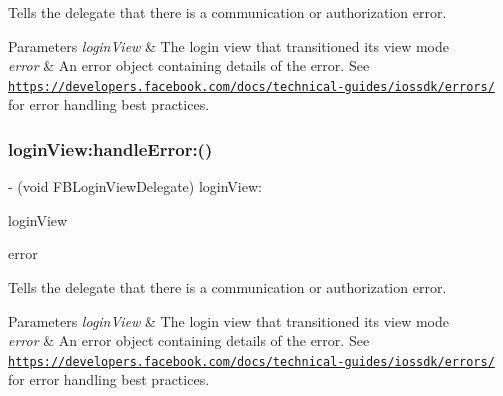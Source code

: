Tells the delegate that there is a communication or authorization error.


\begin{DoxyParams}{Parameters}
{\em login\+View} & The login view that transitioned its view mode \\
\hline
{\em error} & An error object containing details of the error.  See \href{https://developers.facebook.com/docs/technical-guides/iossdk/errors/}{\tt https\+://developers.\+facebook.\+com/docs/technical-\/guides/iossdk/errors/} for error handling best practices. \\
\hline
\end{DoxyParams}
\mbox{\label{protocolFBLoginViewDelegate_01-p_a4cc27024e9c1fac02fbc65fd6bfba993}} 
\subsubsection{\texorpdfstring{login\+View\+:handle\+Error\+:()}{loginView:handleError:()}\hspace{0.1cm}{\footnotesize\ttfamily [2/5]}}
{\footnotesize\ttfamily -\/ (void F\+B\+Login\+View\+Delegate) login\+View\+: \begin{DoxyParamCaption}\item[{(\hyperlink{interfaceFBLoginView}{F\+B\+Login\+View} $\ast$)}]{login\+View }\item[{handleError:(N\+S\+Error $\ast$)}]{error }\end{DoxyParamCaption}\hspace{0.3cm}{\ttfamily [optional]}}

Tells the delegate that there is a communication or authorization error.


\begin{DoxyParams}{Parameters}
{\em login\+View} & The login view that transitioned its view mode \\
\hline
{\em error} & An error object containing details of the error.  See \href{https://developers.facebook.com/docs/technical-guides/iossdk/errors/}{\tt https\+://developers.\+facebook.\+com/docs/technical-\/guides/iossdk/errors/} for error handling best practices. \\
\hline
\end{DoxyParams}
\mbox{\label{protocolFBLoginViewDelegate_01-p_a4cc27024e9c1fac02fbc65fd6bfba993}} 
